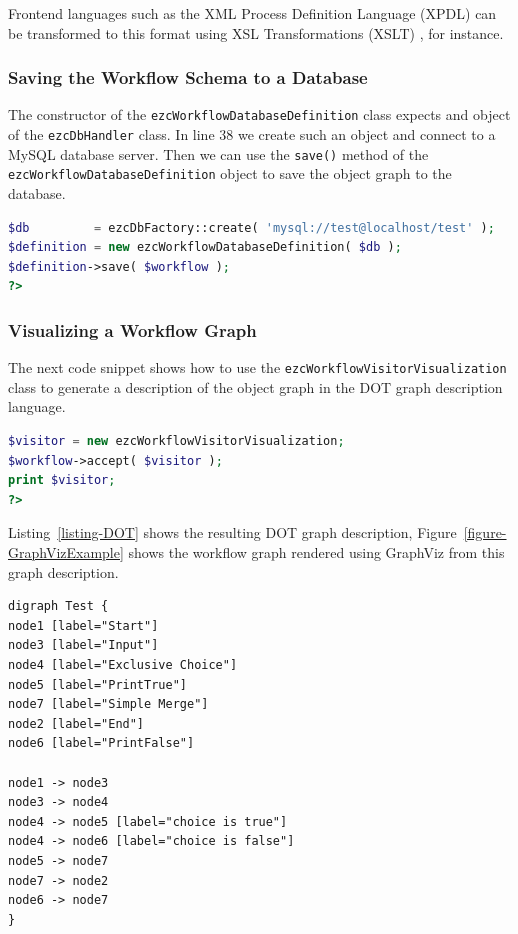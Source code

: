 Frontend languages such as the XML Process Definition Language (XPDL)
\cite{WfMC05} can be transformed to this format using XSL Transformations
(XSLT) \cite{W3C07}, for instance.

\subsubsection{Saving the Workflow Schema to a Database}

The constructor of the \texttt{ezcWorkflowDatabaseDefinition} class expects
and object of the \texttt{ezcDbHandler} class. In line 38 we create such an
object and connect to a MySQL database server. Then we can use the
\texttt{save()} method of the \texttt{ezcWorkflowDatabaseDefinition} object
to save the object graph to the database.

\begin{lstlisting}[language=PHP,firstnumber=38]
$db         = ezcDbFactory::create( 'mysql://test@localhost/test' );
$definition = new ezcWorkflowDatabaseDefinition( $db );
$definition->save( $workflow );
?>
\end{lstlisting}

\subsubsection{Visualizing a Workflow Graph}

The next code snippet shows how to use the \texttt{ezcWorkflowVisitorVisualization}
class to generate a description of the object graph in the DOT graph description
language.

\begin{lstlisting}[language=PHP,firstnumber=38]
$visitor = new ezcWorkflowVisitorVisualization;
$workflow->accept( $visitor );
print $visitor;
?>
\end{lstlisting}

Listing~\ref{listing-DOT} shows the resulting DOT graph description,
Figure~\ref{figure-GraphVizExample} shows the workflow graph rendered using
GraphViz from this graph description.

\begin{lstlisting}[firstnumber=1,stepnumber=100,float,caption={Workflow specification in DOT markup},label=listing-DOT]
digraph Test {
node1 [label="Start"]
node3 [label="Input"]
node4 [label="Exclusive Choice"]
node5 [label="PrintTrue"]
node7 [label="Simple Merge"]
node2 [label="End"]
node6 [label="PrintFalse"]

node1 -> node3
node3 -> node4
node4 -> node5 [label="choice is true"]
node4 -> node6 [label="choice is false"]
node5 -> node7
node7 -> node2
node6 -> node7
}
\end{lstlisting}

